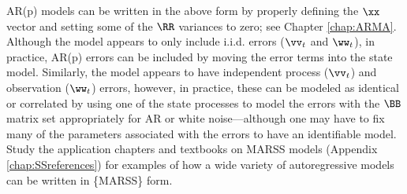 AR(p) models can be written in the above form by properly defining the $\xx$ vector and setting some of the $\RR$ variances to zero; see Chapter \ref{chap:ARMA}. Although the model appears to only include i.i.d. errors ($\vv_t$ and $\ww_t$), in practice, AR(p) errors can be included by moving the error terms into the state model.  Similarly, the model appears to have independent process ($\vv_t$) and observation ($\ww_t$) errors, however, in practice, these can be modeled as identical or correlated by using one of the state processes to model the errors with the $\BB$ matrix set appropriately for AR or white noise---although one may have to fix many of the parameters associated with the errors to have an identifiable model.  Study the application chapters and textbooks on MARSS models (Appendix \ref{chap:SSreferences}) for examples of how a wide variety of autoregressive models can be written in \{MARSS\} form.  

